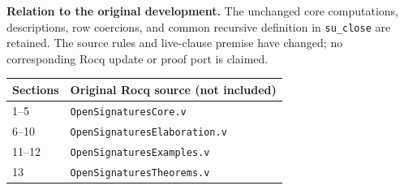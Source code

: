 \textbf{Relation to the original development.}
The unchanged core computations, descriptions, row coercions, and common
recursive definition in \texttt{su\_close} are retained. The source rules
and live-clause premise have changed; no corresponding Rocq update or
proof port is claimed.
\begin{center}
\begin{tabular}{@{}ll@{}}
\toprule
Sections & Original Rocq source (not included)\\
\midrule
1--5 & \texttt{OpenSignaturesCore.v}\\
6--10 & \texttt{OpenSignaturesElaboration.v}\\
11--12 & \texttt{OpenSignaturesExamples.v}\\
13 & \texttt{OpenSignaturesTheorems.v}\\
\bottomrule
\end{tabular}
\end{center}
